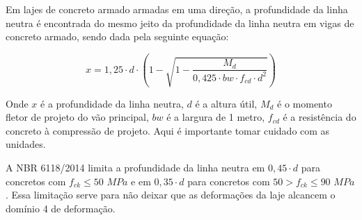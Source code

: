 Em lajes de concreto armado armadas em uma direção, a profundidade da linha neutra é encontrada do mesmo jeito da profundidade da linha neutra em vigas de concreto armado, sendo dada pela seguinte equação:

$$x=1,25\cdot d\cdot\left(1-\sqrt{1-\frac{M_d}{0,425\cdot bw\cdot f_{cd}\cdot d^2}} \right )$$

Onde $x$ é a profundidade da linha neutra, $d$ é a altura útil, $M_d$ é o momento fletor de projeto do vão principal, $bw$ é a largura de 1 metro, $f_{cd}$ é a resistência do concreto à compressão de projeto. Aqui é importante tomar cuidado com as unidades.

A NBR 6118/2014 limita a profundidade da linha neutra em $0,45\cdot d$ para concretos com $f_{ck}\leqslant 50$ $MPa$ e em $0,35\cdot d$ para concretos com $50>f_{ck}\leqslant 90$ $MPa$. Essa limitação serve para não deixar que as deformações da laje alcancem o domínio 4 de deformação.